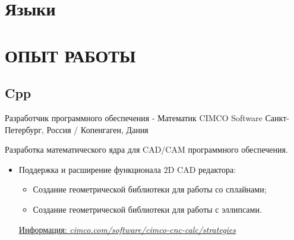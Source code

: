 \documentclass[11pt,a4paper]{moderncv}
\begin{document}
\section{Языки}


\section{ОПЫТ РАБОТЫ}
\subsection{Cpp}
{Разработчик программного обеспечения - Математик}
{\newline CIMCO Software}
{\newline Санкт-Петербург, Россия / Копенгаген, Дания}
{}
{Разработка математического ядра для CAD/CAM программного обеспечения.\newline{}
\begin{itemize}
\item Поддержка и расширение функционала 2D CAD редактора:
  \begin{itemize}%
  \item Создание геометрической библиотеки для работы со сплайнами;
  \item Создание геометрической библиотеки для работы с эллипсами.
  \end{itemize}
  \href{http://www.cimco.com/software/cimco-cnc-calc/strategies}
       {Информация: \underline{\emph{\textcolor[rgb]{0.00,0.00,0.50}{cimco.com/software/cimco-cnc-calc/strategies}}}}
\end{itemize}}

\vspace{20 pt}
\end{document}
